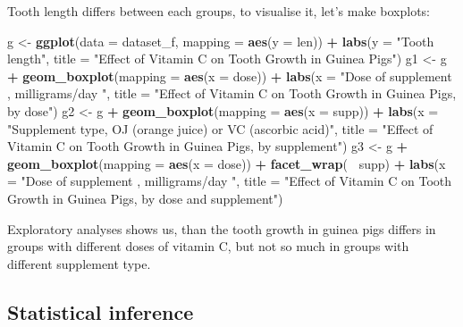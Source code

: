 \documentclass[]{article}
\newenvironment{Shaded}{\begin{snugshade}}{\end{snugshade}}
\newcommand{\KeywordTok}[1]{\textcolor[rgb]{0.13,0.29,0.53}{\textbf{#1}}}
\newcommand{\DataTypeTok}[1]{\textcolor[rgb]{0.13,0.29,0.53}{#1}}
\newcommand{\StringTok}[1]{\textcolor[rgb]{0.31,0.60,0.02}{#1}}
\newcommand{\OperatorTok}[1]{\textcolor[rgb]{0.81,0.36,0.00}{\textbf{#1}}}
\newcommand{\NormalTok}[1]{#1}
\begin{document}
Tooth length differs between each groups, to visualise it, let's make
boxplots:

\begin{Shaded}
\begin{Highlighting}[]
\NormalTok{g <-}\StringTok{ }\KeywordTok{ggplot}\NormalTok{(}\DataTypeTok{data =}\NormalTok{ dataset_f, }\DataTypeTok{mapping =} \KeywordTok{aes}\NormalTok{(}\DataTypeTok{y =}\NormalTok{ len)) }\OperatorTok{+}
\StringTok{    }\KeywordTok{labs}\NormalTok{(}\DataTypeTok{y =} \StringTok{"Tooth length"}\NormalTok{, }
         \DataTypeTok{title =} \StringTok{"Effect of Vitamin C on Tooth Growth in Guinea Pigs"}\NormalTok{)}
\NormalTok{g1 <-}\StringTok{ }\NormalTok{g }\OperatorTok{+}\StringTok{ }\KeywordTok{geom_boxplot}\NormalTok{(}\DataTypeTok{mapping =} \KeywordTok{aes}\NormalTok{(}\DataTypeTok{x =}\NormalTok{ dose)) }\OperatorTok{+}
\StringTok{    }\KeywordTok{labs}\NormalTok{(}\DataTypeTok{x =} \StringTok{"Dose of supplement , milligrams/day "}\NormalTok{,}
         \DataTypeTok{title =} \StringTok{"Effect of Vitamin C on Tooth Growth in Guinea Pigs, by dose"}\NormalTok{)}
\NormalTok{g2 <-}\StringTok{ }\NormalTok{g }\OperatorTok{+}\StringTok{ }\KeywordTok{geom_boxplot}\NormalTok{(}\DataTypeTok{mapping =} \KeywordTok{aes}\NormalTok{(}\DataTypeTok{x =}\NormalTok{ supp)) }\OperatorTok{+}
\StringTok{    }\KeywordTok{labs}\NormalTok{(}\DataTypeTok{x =} \StringTok{"Supplement type, OJ (orange juice) or VC (ascorbic acid)"}\NormalTok{,}
         \DataTypeTok{title =} \StringTok{"Effect of Vitamin C on Tooth Growth in Guinea Pigs, by supplement"}\NormalTok{)}
\NormalTok{g3 <-}\StringTok{ }\NormalTok{g }\OperatorTok{+}\StringTok{ }\KeywordTok{geom_boxplot}\NormalTok{(}\DataTypeTok{mapping =} \KeywordTok{aes}\NormalTok{(}\DataTypeTok{x =}\NormalTok{ dose)) }\OperatorTok{+}
\StringTok{    }\KeywordTok{facet_wrap}\NormalTok{(}\OperatorTok{~}\StringTok{ }\NormalTok{supp) }\OperatorTok{+}
\StringTok{    }\KeywordTok{labs}\NormalTok{(}\DataTypeTok{x =} \StringTok{"Dose of supplement , milligrams/day "}\NormalTok{,}
         \DataTypeTok{title =} \StringTok{"Effect of Vitamin C on Tooth Growth in Guinea Pigs, by dose and supplement"}\NormalTok{)}
\end{Highlighting}
\end{Shaded}

Exploratory analyses shows us, than the tooth growth in guinea pigs
differs in groups with different doses of vitamin C, but not so much in
groups with different supplement type.

\subsection{Statistical inference}\label{statistical-inference}
\end{document}
